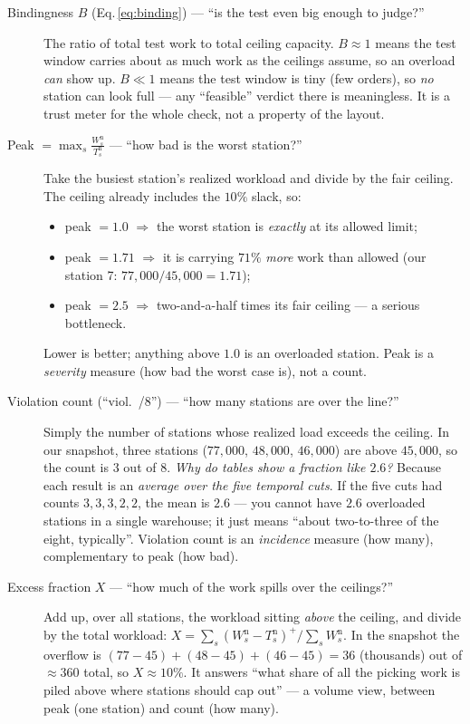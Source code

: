 \documentclass[11pt]{article}
\theoremstyle{definition}
\theoremstyle{plain}
\theoremstyle{remark}
\begin{document}
\begin{description}
  \item[\quad Bindingness $B$ (Eq.\,\ref{eq:binding}) --- ``is the test even big
  enough to judge?''] The ratio of total test work to total ceiling capacity.
  $B\approx 1$ means the test window carries about as much work as the ceilings
  assume, so an overload \emph{can} show up. $B\ll 1$ means the test window is
  tiny (few orders), so \emph{no} station can look full --- any ``feasible''
  verdict there is meaningless. It is a trust meter for the whole check, not a
  property of the layout.

  \item[\quad Peak $=\displaystyle\max_s \frac{W^{\mathrm n}_s}{T^{\mathrm n}_s}$
  --- ``how bad is the worst station?''] Take the busiest station's realized
  workload and divide by the fair ceiling. The ceiling already includes the
  $10\%$ slack, so:
  \begin{itemize}[nosep]
    \item peak $=1.0$ $\Rightarrow$ the worst station is \emph{exactly} at its
    allowed limit;
    \item peak $=1.71$ $\Rightarrow$ it is carrying $71\%$ \emph{more} work than
    allowed (our station 7: $77{,}000/45{,}000=1.71$);
    \item peak $=2.5$ $\Rightarrow$ two-and-a-half times its fair ceiling --- a
    serious bottleneck.
  \end{itemize}
  Lower is better; anything above $1.0$ is an overloaded station. Peak is a
  \emph{severity} measure (how bad the worst case is), not a count.

  \item[\quad Violation count (``viol.\ /8'') --- ``how many stations are over
  the line?''] Simply the number of stations whose realized load exceeds the
  ceiling. In our snapshot, three stations ($77{,}000$, $48{,}000$, $46{,}000$)
  are above $45{,}000$, so the count is $3$ out of $8$.
  \emph{Why do tables show a fraction like $2.6$?} Because each result is an
  \emph{average over the five temporal cuts}. If the five cuts had counts
  $3,3,3,2,2$, the mean is $2.6$ --- you cannot have $2.6$ overloaded stations in
  a single warehouse; it just means ``about two-to-three of the eight, typically''.
  Violation count is an \emph{incidence} measure (how many), complementary to
  peak (how bad).

  \item[\quad Excess fraction $X$ --- ``how much of the work spills over the
  ceilings?''] Add up, over all stations, the workload sitting \emph{above} the
  ceiling, and divide by the total workload:
  $X=\sum_s (W^{\mathrm n}_s-T^{\mathrm n}_s)^+ / \sum_s W^{\mathrm n}_s$. In the
  snapshot the overflow is $(77{-}45)+(48{-}45)+(46{-}45)=36$ (thousands) out of
  $\approx 360$ total, so $X\approx 10\%$. It answers ``what share of all the
  picking work is piled above where stations should cap out'' --- a volume view,
  between peak (one station) and count (how many).


\end{description}
\end{document}
